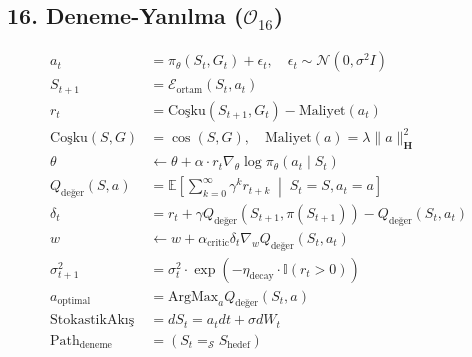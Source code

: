 \documentclass[11pt, a4paper]{article}
\begin{document}
\subsection{16. Deneme-Yanılma ($\mathcal{O}_{16}$)}
\begin{align}
a_t &= \pi_\theta(S_t, G_t) + \epsilon_t, \quad \epsilon_t \sim \mathcal{N}(0, \sigma^2 I) \\
S_{t+1} &= \mathcal{E}_{\text{ortam}}(S_t, a_t) \\
r_t &= \text{Coşku}(S_{t+1}, G_t) - \text{Maliyet}(a_t) \\
\text{Coşku}(S, G) &= \cos(S, G), \quad \text{Maliyet}(a) = \lambda \|a\|_{\mathbf{H}}^2 \\
\theta &\leftarrow \theta + \alpha \cdot r_t \nabla_\theta \log \pi_\theta(a_t \mid S_t) \\
Q_{\text{değer}}(S, a) &= \mathbb{E}\left[ \sum_{k=0}^\infty \gamma^k r_{t+k} \;\middle|\; S_t=S, a_t=a \right] \\
\delta_t &= r_t + \gamma Q_{\text{değer}}(S_{t+1}, \pi(S_{t+1})) - Q_{\text{değer}}(S_t, a_t) \\
w &\leftarrow w + \alpha_{\text{critic}} \delta_t \nabla_w Q_{\text{değer}}(S_t, a_t) \\
\sigma^2_{t+1} &= \sigma^2_t \cdot \exp(-\eta_{\text{decay}} \cdot \mathbb{I}(r_t > 0)) \\
a_{\text{optimal}} &= \text{ArgMax}_a Q_{\text{değer}}(S_t, a) \\
\text{StokastikAkış} &= dS_t = a_t dt + \sigma dW_t \\
\text{Path}_{\text{deneme}} &= (S_t =_{\mathcal{S}} S_{\text{hedef}})
\end{align}
\end{document}
